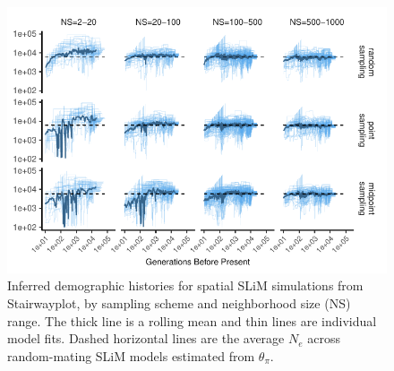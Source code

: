 \documentclass[10pt,twoside,lineno]{gsajnl}
\begin{document}
\afterpage{\clearpage}
\begin{figure}[p]
\centering
\includegraphics[width=\textwidth]{figures/stairwayplot_facet_rollmean.pdf}
\caption{Inferred demographic histories for spatial SLiM simulations from Stairwayplot, by sampling scheme and neighborhood size (NS) range. The thick line is a rolling mean and thin lines are individual model fits. Dashed horizontal lines are the average $N_{e}$ across random-mating SLiM models estimated from $\theta_{\pi}$.}
\label{fig:demography}
\end{figure}
\end{document}
